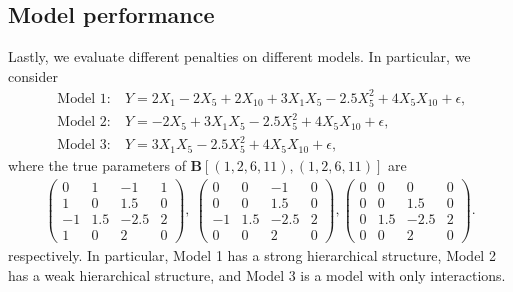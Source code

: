 \documentclass[preprint,authoryear,11pt]{elsarticle}
\newcommand{\B}{\mathbf B}
\begin{document}
 

\begin{table}[!htbp] \centering  
	\caption{Average computation times (standard deviation) of ``HiQR" under hybrid penalties with 500 tuning pairs over 10 replications.  Time is recorded in seconds.} 
	  \label{tab4} 
\end{table} 


\subsection{Model performance}
Lastly, we evaluate different penalties on different models. In particular, we consider  
\begin{align}
	\mbox{ Model 1:}&~Y=2X_1-2X_5+2X_{10}+3X_1X_5-2.5X_5^2+4X_5X_{10}+\epsilon, \label{m1} \\
	\mbox{ Model 2:}&~Y=-2X_5+3X_1X_5-2.5X_5^2+4X_5X_{10}+\epsilon, \label{m2}	\\
	\mbox{ Model 3:}&~Y=3X_1X_5-2.5X_5^2+4X_5X_{10}+\epsilon, \label{m3}		
	\end{align}
	where the true parameters of $\B[(1,2,6,11),(1,2,6,11)]$ are 
	\begin{align*}
	\begin{pmatrix}
		0&1&-1&1\\
		1&0&1.5&0\\
		-1&1.5&-2.5&2\\
		1&0&2&0
	\end{pmatrix},~\begin{pmatrix}
		0&0&-1&0\\
		0&0&1.5&0\\
		-1&1.5&-2.5&2\\
		0&0&2&0
	\end{pmatrix},\begin{pmatrix}
		0&0&0&0\\
		0&0&1.5&0\\
		0&1.5&-2.5&2\\
		0&0&2&0
	\end{pmatrix}.
	\end{align*}
	respectively. 
In particular, Model 1 has a strong hierarchical structure, Model 2 has a weak hierarchical structure, and Model 3 is a model with only interactions.
\end{document}
